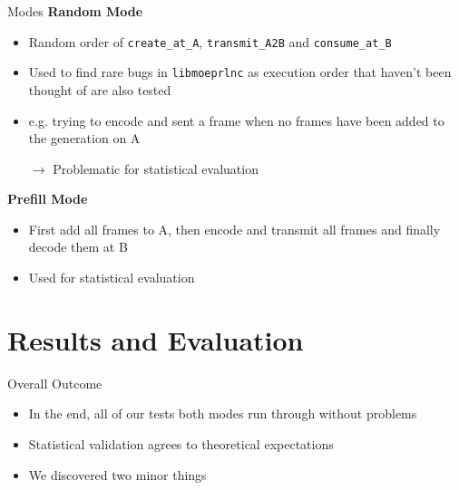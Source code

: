 \documentclass[t]{beamer} %
\begin{document}
\begin{frame}{Modes}
  \textbf{Random Mode}
  \begin{itemize}
    \item Random order of \texttt{create\_at\_A}, \texttt{transmit\_A2B} and \texttt{consume\_at\_B}
    \item Used to find rare bugs in \texttt{libmoeprlnc} as execution order that haven't been thought of are also tested
    \item e.g. trying to encode and sent a frame when no frames have been added to the generation on A
    \pause
    \item[$\rightarrow$] Problematic for statistical evaluation
  \end{itemize}
  \pause
  \textbf{Prefill Mode}
  \begin{itemize}
    \item First add all frames to A, then encode and transmit all frames and finally decode them at B
    \item Used for statistical evaluation
  \end{itemize}
\end{frame}

\section{Results and Evaluation}

\begin{frame}{Overall Outcome}
  \begin{itemize}
    \item In the end, all of our tests both modes run through without problems
    \item Statistical validation agrees to theoretical expectations
    \item We discovered two minor things
  \end{itemize}
\end{frame}
\end{document}
